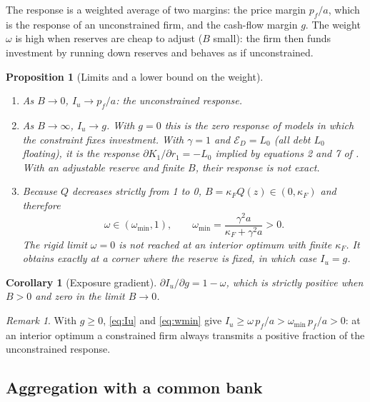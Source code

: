\documentclass[11pt]{article}
\newtheorem{proposition}{Proposition}
\newtheorem{corollary}{Corollary}
\theoremstyle{remark}
\newtheorem{remark}{Remark}
\begin{document}
The response is a weighted average of two margins: the price margin $p_f/a$, which is the response of an unconstrained firm, and
the cash-flow margin $g$. The weight $\omega$ is high when reserves are cheap to adjust ($B$ small): the firm then funds
investment by running down reserves and behaves as if unconstrained.

\begin{proposition}[Limits and a lower bound on the weight]\label{prop:limits}
\begin{enumerate}
\item[(i)] As $B\to0$, $I_u\to p_f/a$: the unconstrained response.
\item[(ii)] As $B\to\infty$, $I_u\to g$. With $g=0$ this is the zero response of models in which the constraint fixes
investment. With $\gamma=1$ and $\mathcal{E}_D=L_0$ (all debt $L_0$ floating), it is the response $\partial K_1/\partial r_1=-L_0$
implied by equations 2 and 7 of \citet[WP pp.~10--11]{IppolitoOzdagliPerezOrive2018}. With an adjustable reserve and finite
$B$, their response is not exact.
\item[(iii)] Because $Q$ decreases strictly from 1 to 0, $B=\kappa_F Q(z)\in(0,\kappa_F)$ and therefore
\begin{equation}\label{eq:wmin}
\omega\in(\omega_{\min},1),\qquad \omega_{\min}=\frac{\gamma^2 a}{\kappa_F+\gamma^2 a}>0 .
\end{equation}
The rigid limit $\omega=0$ is not reached at an interior optimum with finite $\kappa_F$. It obtains exactly at a corner where
the reserve is fixed, in which case $I_u=g$.
\end{enumerate}
\end{proposition}

\begin{corollary}[Exposure gradient]\label{cor:gradient}
$\partial I_u/\partial g=1-\omega$, which is strictly positive when $B>0$ and zero in the limit $B\to0$.
\end{corollary}

\begin{remark}\label{rem:chain}
With $g\ge0$, \eqref{eq:Iu} and \eqref{eq:wmin} give $I_u\ge\omega\,p_f/a>\omega_{\min}\,p_f/a>0$: at an interior optimum a
constrained firm always transmits a positive fraction of the unconstrained response.
\end{remark}

\subsection{Aggregation with a common bank}\label{sec:aggregation}
\end{document}
